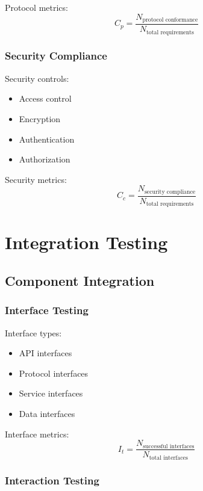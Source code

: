 \documentclass[12pt]{article}
\begin{document}
Protocol metrics:
\begin{equation}
C_p = \frac{N_{\text{protocol conformance}}}{N_{\text{total requirements}}}
\end{equation}

\subsubsection{Security Compliance}

Security controls:
\begin{itemize}
\item Access control
\item Encryption
\item Authentication
\item Authorization
\end{itemize}

Security metrics:
\begin{equation}
C_c = \frac{N_{\text{security compliance}}}{N_{\text{total requirements}}}
\end{equation}

\section{Integration Testing}

\subsection{Component Integration}

\subsubsection{Interface Testing}

Interface types:
\begin{itemize}
\item API interfaces
\item Protocol interfaces
\item Service interfaces
\item Data interfaces
\end{itemize}

Interface metrics:
\begin{equation}
I_t = \frac{N_{\text{successful interfaces}}}{N_{\text{total interfaces}}}
\end{equation}

\subsubsection{Interaction Testing}
\end{document}
